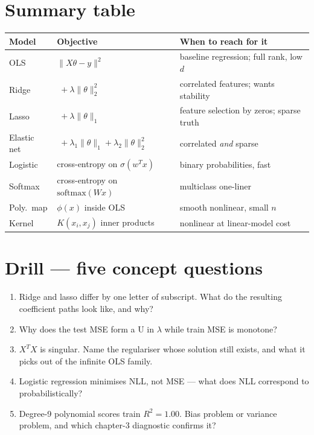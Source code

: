 \section{Summary table}

\begin{tabularx}{\linewidth}{@{}l l X@{}}
\toprule
\textbf{Model} & \textbf{Objective} & \textbf{When to reach for it}\\
\midrule
OLS & $\|X\theta - y\|^2$ & baseline regression; full rank, low $d$\\
Ridge & $\;+\lambda\|\theta\|_2^2$ & correlated features; wants stability\\
Lasso & $\;+\lambda\|\theta\|_1$ & feature selection by zeros; sparse truth\\
Elastic net & $\;+\lambda_1\|\theta\|_1 + \lambda_2\|\theta\|_2^2$ &
  correlated \emph{and} sparse\\
Logistic & cross-entropy on $\sigma(w^Tx)$ & binary probabilities, fast\\
Softmax & cross-entropy on $\mathrm{softmax}(Wx)$ & multiclass one-liner\\
Poly.~map & $\phi(x)$ inside OLS & smooth nonlinear, small $n$\\
Kernel & $K(x_i, x_j)$ inner products & nonlinear at linear-model cost\\
\bottomrule
\end{tabularx}

\section{Drill --- five concept questions}

\begin{enumerate}
\item Ridge and lasso differ by one letter of subscript. What do the
  resulting coefficient paths look like, and why?
\item Why does the test MSE form a U in $\lambda$ while train MSE is
  monotone?
\item $X^TX$ is singular. Name the regulariser whose solution still
  exists, and what it picks out of the infinite OLS family.
\item Logistic regression minimises NLL, not MSE --- what does NLL
  correspond to probabilistically?
\item Degree-9 polynomial scores train $R^2 = 1.00$. Bias problem or
  variance problem, and which chapter-3 diagnostic confirms it?
\end{enumerate}

